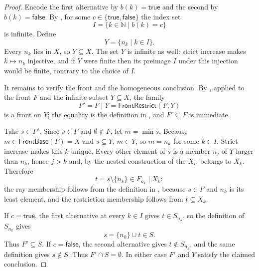 \begin{proof}
Encode the first alternative by $b(k)=\mathsf{true}$ and the second by
$b(k)=\mathsf{false}$.  By
, for some $c\in\{\mathsf{true},
\mathsf{false}\}$ the index set
\[
 I=\{k\in\mathbb N\mid b(k)=c\}
\]
is infinite.  Define
\[
 Y=\{n_k\mid k\in I\}.
\]
Every $n_k$ lies in $X$, so $Y\subseteq X$.  The set $Y$ is infinite as
well: strict increase makes $k\mapsto n_k$ injective, and if $Y$ were
finite then its preimage $I$ under this injection would be finite, contrary
to the choice of $I$.

It remains to verify the front and the homogeneous conclusion.  By
, applied to the front $F$ and the infinite
subset $Y\subseteq X$, the family
\[
 F'=F\mathbin{|}Y
   =\mathsf{FrontRestrict}(F,Y)
\]
is a front on $Y$; the equality is the definition in
, and $F'\subseteq F$ is immediate.

Take $s\in F'$.  Since $s\in F$ and $\emptyset\notin F$, let
$m=\min s$.  Because $m\in\mathsf{FrontBase}(F)=X$ and $s\subseteq Y$,
$m\in Y$, so $m=n_k$ for some $k\in I$.  Strict increase makes this $k$
unique.  Every other element of $s$ is a member $n_j$ of $Y$ larger than
$n_k$, hence $j>k$ and, by the nested construction of the $X_i$, belongs
to $X_k$.  Therefore
\[
 t=s\setminus\{n_k\}\in F_{n_k}\mathbin{|}X_k:
\]
the ray membership follows from the definition in , because
$s\in F$ and $n_k$ is its least element, and the restriction membership
follows from $t\subseteq X_k$.

If $c=\mathsf{true}$, the first alternative at every $k\in I$ gives
$t\in S_{n_k}$, so the definition of $S_{n_k}$ gives
\[
 s=\{n_k\}\cup t\in S.
\]
Thus $F'\subseteq S$.  If $c=\mathsf{false}$, the second alternative
gives $t\notin S_{n_k}$, and the same definition gives $s\notin S$.
Thus $F'\cap S=\emptyset$.  In either case $F'$ and $Y$ satisfy the
claimed conclusion.
\end{proof}
